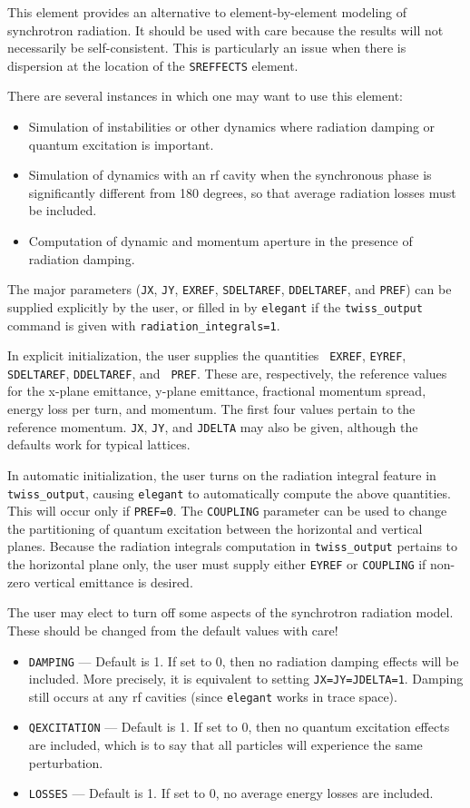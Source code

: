 This element provides an alternative to element-by-element modeling of synchrotron radiation.
It should be used with care because the results will not necessarily be self-consistent.
This is particularly an issue when there is dispersion at the location of the \verb|SREFFECTS|
element.

There are several instances in which one may want to use this element:
\begin{itemize}
\item Simulation of instabilities or other dynamics where radiation damping or quantum excitation is important.
\item Simulation of dynamics with an rf cavity when the synchronous phase is significantly
  different from 180 degrees, so that average radiation losses must be included.
\item Computation of dynamic and momentum aperture in the presence of radiation damping.
\end{itemize}

The major parameters (\verb|JX|, \verb|JY|, \verb|EXREF|, \verb|SDELTAREF|,
\verb|DDELTAREF|, and \verb|PREF|) can be supplied explicitly by the user, or filled in by {\tt elegant}
if the \verb|twiss_output| command is given with \verb|radiation_integrals=1|.

In explicit initialization, the user supplies the quantities {\tt
EXREF}, {\tt EYREF}, {\tt SDELTAREF}, {\tt DDELTAREF}, and {\tt
PREF}.  These are, respectively, the reference values for the x-plane
emittance, y-plane emittance, fractional momentum spread, energy loss
per turn, and momentum.  The first four values pertain to the
reference momentum.  {\tt JX}, {\tt JY}, and {\tt JDELTA} may also
be given, although the defaults work for typical lattices.

In automatic initialization, the user turns on the radiation integral
feature in {\tt twiss\_output}, causing {\tt elegant} to automatically
compute the above quantities.  This will occur only if {\tt PREF=0}.
The {\tt COUPLING} parameter can be used to change the partitioning of
quantum excitation between the horizontal and vertical planes.
Because the radiation integrals computation in \verb|twiss_output| pertains to the
horizontal plane only, the user must supply either \verb|EYREF| or \verb|COUPLING| if
non-zero vertical emittance is desired.

The user may elect to turn off some aspects of the synchrotron radiation model.  These should be
changed from the default values with care!
\begin{itemize}
\item \verb|DAMPING| --- Default is 1.  If set to 0, then no radiation damping effects will be included.
  More precisely, it is equivalent to setting \verb|JX=JY=JDELTA=1|.  Damping still occurs at any
  rf cavities (since {\tt elegant} works in trace space).
\item \verb|QEXCITATION| --- Default is 1.  If set to 0, then no quantum excitation effects are included,
  which is to say that all particles will experience the same perturbation.  
\item \verb|LOSSES| --- Default is 1.  If set to 0, no average energy losses are included.
\end{itemize}
  

